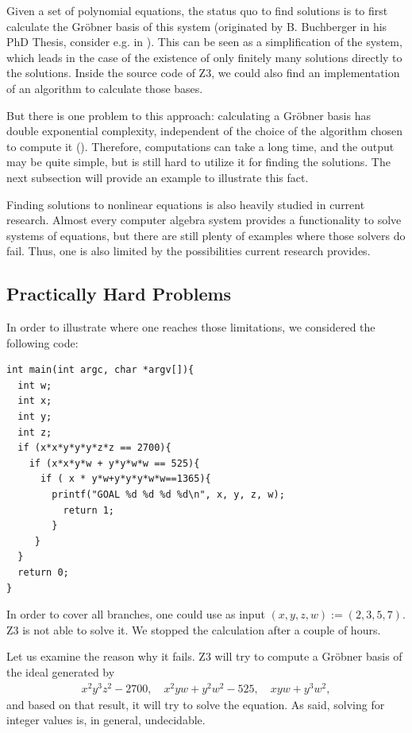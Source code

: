 \documentclass[oribibl]{llncs}
\begin{document}
Given a set of polynomial equations, the status quo to find solutions
is to first calculate the Gr\"obner basis of this system (originated by B. Buchberger in his PhD Thesis, consider e.g. in \cite{buchberger1970algorithmisches}). This can be seen as a
simplification of the system, which leads in the case of the existence
of only finitely many solutions directly to the solutions. Inside the
source code of \textsc{Z3}, we could also find an implementation of an
algorithm to calculate those bases.

But there is one problem to this approach: calculating a Gr\"obner
basis has double exponential complexity, independent of the choice
of the algorithm chosen to compute it (\cite{mayr1982complexity}). Therefore,
computations can take a long time, and the output may be quite simple, but is still hard to utilize it for finding the solutions. The next subsection will provide an example to illustrate
this fact.

Finding solutions to nonlinear equations is also heavily studied in current
research. Almost every computer algebra system provides a
functionality to solve systems of equations, but there are still
plenty of examples where those solvers do fail. Thus, one is also
limited by the possibilities current research provides.

\subsection{Practically Hard Problems}

In order to illustrate where one reaches those limitations, we
considered the following code:

\begin{verbatim}
int main(int argc, char *argv[]){
  int w;
  int x;
  int y;
  int z;
  if (x*x*y*y*y*z*z == 2700){
    if (x*x*y*w + y*y*w*w == 525){
      if ( x * y*w+y*y*y*w*w==1365){
        printf("GOAL %d %d %d %d\n", x, y, z, w);
          return 1;
        }
     }
  }
  return 0;
}
\end{verbatim}

In order to cover all branches, one could use as input $(x,y,z,w) :=
(2,3,5,7)$. \textsc{Z3} is not able to solve it. We stopped the
calculation after a couple of hours.

Let us examine the reason why it fails. \textsc{Z3} will try to compute
a Gr\"obner basis of the ideal generated by
\begin{eqnarray*}
  x^2y^3z^2 - 2700, \quad x^2yw + y^2w^2 - 525, \quad xyw + y^3w^2,
\end{eqnarray*}
and based on that result, it will try to solve the equation. As said,
solving for integer values is, in general, undecidable.
\end{document}
